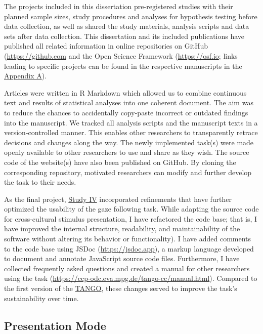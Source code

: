 \documentclass[
]{scrbook}
\begin{document}
The projects included in this dissertation pre-registered studies with their planned sample sizes, study procedures and analyses for hypothesis testing before data collection, as well as shared the study materials, analysis scripts and data sets after data collection. This dissertation and its included publications have published all related information in online repositories on GitHub (\mbox{\url{https://github.com}} and the Open Science Framework (\mbox{\url{https://osf.io}}; links leading to specific projects can be found in the respective manuscripts in the \hyperref[appendixA]{Appendix A}).

Articles were written in R Markdown which allowed us to combine continuous text and results of statistical analyses into one coherent document. The aim was to reduce the chances to accidentally copy-paste incorrect or outdated findings into the manuscript. We tracked all analysis scripts and the manuscript texts in a version-controlled manner. This enables other researchers to transparently retrace decisions and changes along the way. The newly implemented task(s) were made openly available to other researchers to use and share as they wish. The source code of the website(s) have also been published on GitHub. By cloning the corresponding repository, motivated researchers can modify and further develop the task to their needs.

As the final project, \hyperref[studyIV]{Study IV} incorporated refinements that have further optimized the usability of the gaze following task. While adapting the source code for cross-cultural stimulus presentation, I have refactored the code base; that is, I have improved the internal structure, readability, and maintainability of the software without altering its behavior or functionality). I have added comments to the code base using JSDoc (\mbox{\url{https://jsdoc.app}}), a markup language developed to document and annotate JavaScript source code files. Furthermore, I have collected frequently asked questions and created a manual for other researchers using the task (\mbox{\url{https://ccp-odc.eva.mpg.de/tango-cc/manual.html}}). Compared to the first version of the \hyperref[acronyms_TANGO]{TANGO}, these changes served to improve the task's sustainability over time.

\subsection{Presentation Mode}\label{presentationmode}
\end{document}
